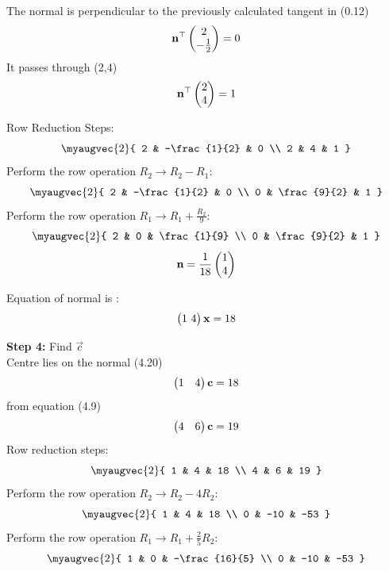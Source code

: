 \documentclass[journal]{IEEEtran}
\begin{document}
The normal is perpendicular to the previously calculated tangent in (0.12)
\begin{equation}
\mathbf{n}^\top \begin{pmatrix}2 \\ -\frac{1}{2}\end{pmatrix} = 0
\end{equation}
\quad It passes through (2,4)
\begin{equation}
\mathbf{n}^\top \begin{pmatrix}2 \\ 4\end{pmatrix} = 1
\end{equation}

Row Reduction Steps:
\begin{equation}
\myaugvec{2}{
2 & -\frac{1}{2} & 0 \\
2 & 4 & 1
}
\end{equation}
Perform the row operation \( R_2 \to R_2 - R_1\):
\begin{equation}
\myaugvec{2}{
2 & -\frac{1}{2} & 0 \\
0 & \frac{9}{2} & 1
}
\end{equation}
Perform the row operation \( R_1 \to R_1 + \frac{R_2}{9}\):
\begin{equation}
\myaugvec{2}{
2 & 0 & \frac{1}{9} \\
0 & \frac{9}{2} & 1
}
\end{equation}
\begin{equation}
\mathbf{n}=\frac{1}{18}\begin{pmatrix}1 \\ 4\end{pmatrix}
\end{equation}

Equation of normal is :
\begin{equation}
\myvec{1 \ 4}\vec{x} = 18
\end{equation}

\textbf{Step 4:} Find $\vec{c}$\\

Centre lies on the normal (4.20)
\begin{equation}
\begin{pmatrix}1 & 4\end{pmatrix}\mathbf{c} = 18
\end{equation}
from equation (4.9)
\begin{equation}
\begin{pmatrix}4 & 6\end{pmatrix}\mathbf{c} = 19
\end{equation}
Row reduction steps:
\begin{equation}
\myaugvec{2}{
1 & 4 & 18 \\
4 & 6 & 19
}
\end{equation}
Perform the row operation \( R_2 \to R_2 - 4R_2\):
\begin{equation}
\myaugvec{2}{
1 & 4 & 18 \\
0 & -10 & -53
}
\end{equation}
Perform the row operation \( R_1 \to R_1 +\frac{2}{5}R_2\):
\begin{equation}
\myaugvec{2}{
1 & 0 & -\frac{16}{5} \\
0 & -10 & -53
}
\end{equation}
\end{document}
